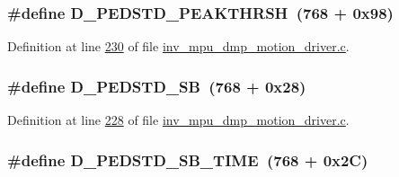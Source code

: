 \subsubsection[{\texorpdfstring{D\+\_\+\+P\+E\+D\+S\+T\+D\+\_\+\+P\+E\+A\+K\+T\+H\+R\+SH}{D_PEDSTD_PEAKTHRSH}}]{\setlength{\rightskip}{0pt plus 5cm}\#define D\+\_\+\+P\+E\+D\+S\+T\+D\+\_\+\+P\+E\+A\+K\+T\+H\+R\+SH~(768 + 0x98)}\hypertarget{group___d_r_i_v_e_r_s_ga3b281a8de65d0ac3ed6321b4df4ab6d0}{}\label{group___d_r_i_v_e_r_s_ga3b281a8de65d0ac3ed6321b4df4ab6d0}


Definition at line \hyperlink{inv__mpu__dmp__motion__driver_8c_source_l00230}{230} of file \hyperlink{inv__mpu__dmp__motion__driver_8c_source}{inv\+\_\+mpu\+\_\+dmp\+\_\+motion\+\_\+driver.\+c}.

\subsubsection[{\texorpdfstring{D\+\_\+\+P\+E\+D\+S\+T\+D\+\_\+\+SB}{D_PEDSTD_SB}}]{\setlength{\rightskip}{0pt plus 5cm}\#define D\+\_\+\+P\+E\+D\+S\+T\+D\+\_\+\+SB~(768 + 0x28)}\hypertarget{group___d_r_i_v_e_r_s_ga50a1a44c925cadaa77b3b88e08db7e08}{}\label{group___d_r_i_v_e_r_s_ga50a1a44c925cadaa77b3b88e08db7e08}


Definition at line \hyperlink{inv__mpu__dmp__motion__driver_8c_source_l00228}{228} of file \hyperlink{inv__mpu__dmp__motion__driver_8c_source}{inv\+\_\+mpu\+\_\+dmp\+\_\+motion\+\_\+driver.\+c}.

\subsubsection[{\texorpdfstring{D\+\_\+\+P\+E\+D\+S\+T\+D\+\_\+\+S\+B\+\_\+\+T\+I\+ME}{D_PEDSTD_SB_TIME}}]{\setlength{\rightskip}{0pt plus 5cm}\#define D\+\_\+\+P\+E\+D\+S\+T\+D\+\_\+\+S\+B\+\_\+\+T\+I\+ME~(768 + 0x2\+C)}\hypertarget{group___d_r_i_v_e_r_s_ga0d3790675bcf0bbb837f2834523aca11}{}\label{group___d_r_i_v_e_r_s_ga0d3790675bcf0bbb837f2834523aca11}


